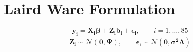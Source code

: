 \documentclass[Chap4amain.tex]{subfiles}
\begin{document}
\newpage
\section{Laird Ware Formulation}
\begin{equation}
\boldsymbol{y_{i}} = \boldsymbol{X_{i}\beta}  + \boldsymbol{Z_{i}b_{i}} + \boldsymbol{\epsilon_{i}}, \qquad i=1,\dots,85
\end{equation}
\begin{eqnarray}
\boldsymbol{Z_{i}} \sim \mathcal{N}(\boldsymbol{0,\Psi}),\qquad
\boldsymbol{\epsilon_{i}} \sim \mathcal{N}(\boldsymbol{0,\sigma^2\Lambda})
\end{eqnarray}


\end{document}
